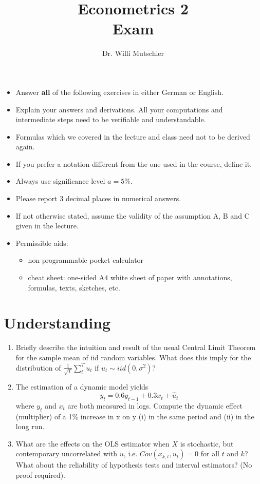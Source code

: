 \documentclass{article}
\begin{document}
	
	\title{Econometrics 2 \\ \small Exam}
	\author{Dr. Willi Mutschler}
	\date{}
	\maketitle
	
	\begin{itemize}
		\item Answer \textbf{all} of the following exercises in either German or English.
		\item Explain your answers and derivations. All your computations and intermediate steps need to be verifiable and understandable. 
		\item Formulas which we covered in the lecture and class need not to be derived again.
		\item If you prefer a notation different from the one used in the course, define it.
		\item Always use significance level $a=5\%$.
		\item Please report 3 decimal places in numerical answers.
		\item If not otherwise stated, assume the validity of the assumption A, B and C given in the lecture.
		\item Permissible aids:
		\begin{itemize}
			\item non-programmable pocket calculator
			\item cheat sheet: one-sided A4 white sheet of paper with annotations, formulas, texts, sketches, etc.
		\end{itemize}
	\end{itemize}
\thispagestyle{empty}

\newpage
\setcounter{page}{1}
\section{Understanding}
\begin{enumerate}[label=(\alph*)]
\item Briefly describe the intuition and result of the usual Central Limit Theorem for the sample mean of iid random variables.  What does this imply for the distribution of $\frac{1}{\sqrt{T}} \sum_{t}^{T} u_t$ if $u_t \sim iid(0,\sigma^2)$?
\item The estimation of a dynamic model yields
$$y_t = 0.6 y_{t-1} + 0.3 x_t +\hat{u}_t$$
where $y_t$ and $x_t$ are both measured in logs. Compute the dynamic effect (multiplier) of a 1\% increase in x on y (i) in the same period and (ii) in the long run.
\item What are the effects on the OLS estimator when $X$ is stochastic, but contemporary uncorrelated with $u$, i.e. $Cov(x_{k,t},u_t)=0$ for all $t$ and $k$? What about the reliability of hypothesis tests and interval estimators? (No proof required).
\end{enumerate}
\newpage
\end{document}
